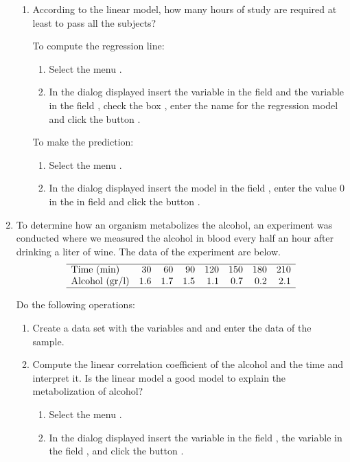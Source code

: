 \begin{enumerate}[leftmargin=*]
\begin{enumerate}
\item According to the linear model, how many hours of study are required at least to pass all the subjects?
\begin{indication}
To compute the regression line:
\begin{enumerate}
\item Select the menu .
\item In the dialog displayed insert the variable  in the field  and
the variable  in the field , check the box , enter the name  for the regression model
and click the button .
\end{enumerate}
To make the prediction:
\begin{enumerate}
\item Select the menu .
\item In the dialog displayed insert the model  in
the field , enter the value 0 in the in field  and click the button
.
\end{enumerate}
\end{indication}
\end{enumerate}


\item To determine how an organism metabolizes the alcohol, an experiment was conducted where we measured the
alcohol in blood every half an hour after drinking a liter of wine.
The data of the experiment are below.
\[
\begin{array}{lrrrrrrr}
\hline 
\mbox{Time (min)} & 30 & 60 & 90 & 120 & 150 & 180 & 210\\ 
\mbox{Alcohol (gr/l)} & 1.6 & 1.7 & 1.5 & 1.1 & 0.7 & 0.2 & 2.1\\
\hline
\end{array}
\]

Do the following operations:
\begin{enumerate}
\item Create a data set with the variables  and  and enter the data of the sample.
\item Compute the linear correlation coefficient of the alcohol and the time and interpret it.
Is the linear model a good model to explain the metabolization of alcohol?
\begin{indication}
\begin{enumerate}
\item Select the menu .
\item In the dialog displayed insert the variable  in the field , the
variable  in the field , and click the button .
\end{enumerate}
\end{indication}


\end{enumerate}
\end{enumerate}
